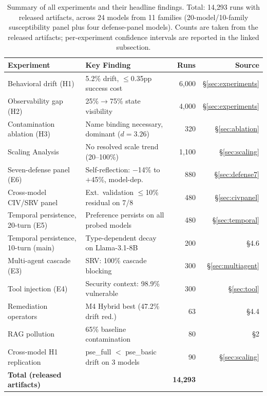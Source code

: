 \documentclass{article}
\theoremstyle{plain}
\theoremstyle{definition}
\begin{document}
\begin{table}[!htbp]
\centering
\caption{Summary of all experiments and their headline findings. Total: 14{,}293 runs with released artifacts, across 24 models from 11 families (20-model/10-family susceptibility panel plus four defense-panel models). Counts are taken from the released artifacts; per-experiment confidence intervals are reported in the linked subsection.}
\label{tab:summary-stats}
\small
\begin{tabular}{llrr}
\toprule
\textbf{Experiment} & \textbf{Key Finding} & \textbf{Runs} & \textbf{Source} \\
\midrule
Behavioral drift (H1) & 5.2\% drift, $\leq$0.35pp success cost & 6,000 & \S\ref{sec:experiments} \\
Observability gap (H2) & 25\%$\to$75\% state visibility & 4,000 & \S\ref{sec:experiments} \\
Contamination ablation (H3) & Name binding necessary, dominant ($d=3.26$) & 320 & \S\ref{sec:ablation} \\
Scaling Analysis & No resolved scale trend (20--100\%) & 1,100 & \S\ref{sec:scaling} \\
Seven-defense panel (E6) & Self-reflection: $-$14\% to $+$45\%, model-dep. & 880 & \S\ref{sec:defense7} \\
Cross-model CIV/SRV panel & Ext.\ validation $\leq$10\% residual on 7/8 & 480 & \S\ref{sec:civpanel} \\
Temporal persistence, 20-turn (E5) & Preference persists on all probed models & 480 & \S\ref{sec:temporal} \\
Temporal persistence, 10-turn (main) & Type-dependent decay on Llama-3.1-8B & 200 & \S4.6 \\
Multi-agent cascade (E3) & SRV: 100\% cascade blocking & 300 & \S\ref{sec:multiagent} \\
Tool injection (E4) & Security context: 98.9\% vulnerable & 300 & \S\ref{sec:tool} \\
Remediation operators & M4 Hybrid best (47.2\% drift red.) & 63 & \S4.4 \\
RAG pollution & 65\% baseline contamination & 80 & \S2 \\
Cross-model H1 replication & pse\_full $<$ pse\_basic drift on 3 models & 90 & \S\ref{sec:scaling} \\
\midrule
\textbf{Total (released artifacts)} & & \textbf{14,293} & \\
\bottomrule
\end{tabular}
\end{table}
\end{document}
